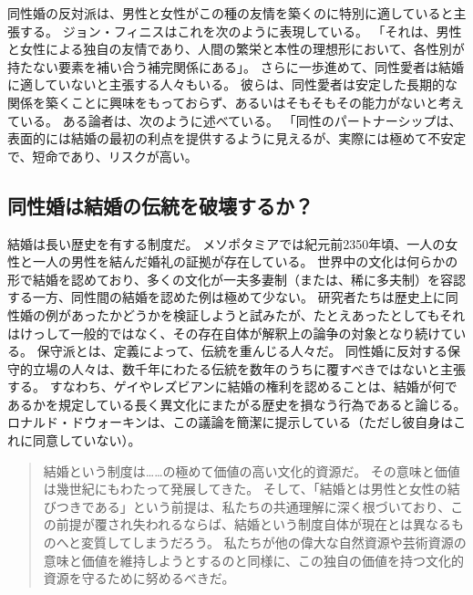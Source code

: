 \documentclass[paper=a4,book,openany]{jlreq}
\newcommand{\ig}[1]{}           %
\begin{document}
同性婚の反対派は、男性と女性がこの種の友情を築くのに特別に適していると主張する。
ジョン・フィニスはこれを次のように表現している。
「それは、男性と女性による独自の友情であり、人間の繁栄と本性の理想形において、各性別が持たない要素を補い合う補完関係にある」\citep[p.398]{finnis08:_marriag}。
さらに一歩進めて、同性愛者は結婚に適していないと主張する人々もいる。
彼らは、同性愛者は安定した長期的な関係を築くことに興味をもっておらず、あるいはそもそもその能力がないと考えている。
ある論者は、次のように述べている。
「同性のパートナーシップは、表面的には結婚の最初の利点を提供するように見えるが、実際には極めて不安定で、短命であり、リスクが高い\citep{fischer13:_purpos_marriag}。

\subsection{同性婚は結婚の伝統を破壊するか？}

結婚は長い歴史を有する制度だ。
メソポタミアでは紀元前2350年頃、一人の女性と一人の男性を結んだ婚礼の証拠が存在している。
世界中の文化は何らかの形で結婚を認めており、多くの文化が一夫多妻制（または、稀に多夫制）を容認する一方、同性間の結婚を認めた例は極めて少ない。
研究者たちは歴史上に同性婚の例があったかどうかを検証しようと試みたが、たとえあったとしてもそれはけっして一般的ではなく、その存在自体が解釈上の論争の対象となり続けている\citep{boswell94:_same_sex_union_pre_moder_europ,shaw94:_review_boswel}。
保守派とは、定義によって、伝統を重んじる人々だ。
同性婚に反対する保守的立場の人々は、数千年にわたる伝統を数年のうちに覆すべきではないと主張する。
すなわち、ゲイやレズビアンに結婚の権利を認めることは、結婚が何であるかを規定している長く異文化にまたがる歴史を損なう行為であると論じる。
ロナルド・ドウォーキン\ig{Ronald Dworkin}は、この議論を簡潔に提示している（ただし彼自身はこれに同意していない）。

\begin{quote}

結婚という制度は……の極めて価値の高い文化的資源だ。
その意味と価値は幾世紀にもわたって発展してきた。
そして、「結婚とは男性と女性の結びつきである」という前提は、私たちの共通理解に深く根づいており、この前提が覆され失われるならば、結婚という制度自体が現在とは異なるものへと変質してしまうだろう。
私たちが他の偉大な自然資源や芸術資源の意味と価値を維持しようとするのと同様に、この独自の価値を持つ文化的資源を守るために努めるべきだ。
\citep[pp. 87--88]{dworkin06:_is_democ_possib_here}

\end{quote}
\end{document}
